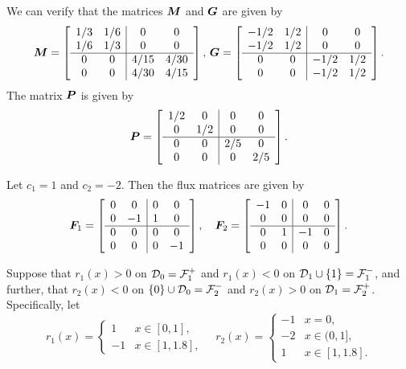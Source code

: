 We can verify that the matrices \(\boldsymbol M\) and \(\boldsymbol G\) are given by 
\[\boldsymbol M = \left[\begin{array}{cc|cc} 1/3 & 1/6 & 0 & 0 \\ 1/6 & 1/3 & 0 & 0 \\\hline 0 & 0 & 4/15 & 4/30 \\ 0 & 0 & 4/30 & 4/15 \end{array}\right],\, \boldsymbol G = \left[\begin{array}{cc|cc} -1/2 & 1/2 & 0 & 0 \\ -1/2 & 1/2 & 0 & 0 \\\hline 0 & 0 & -1/2 & 1/2 \\ 0 & 0 & -1/2 & 1/2 \end{array}\right].\] 
The matrix \(\boldsymbol P\) is given by 
\[\boldsymbol P = \left[\begin{array}{cc|cc} 1/2 & 0 & 0 & 0 \\ 0 & 1/2 & 0 & 0 \\\hline 0 & 0 & 2/5 & 0 \\ 0 & 0 & 0 & 2/5 \end{array}\right].\]

Let \(c_1=1\) and \(c_2=-2\). Then the flux matrices are given by 
\[\boldsymbol F_1 = \left[\begin{array}{cc|cc} 0 & 0 & 0 & 0 \\ 0 & -1 & 1 & 0 \\\hline 0 & 0 & 0 & 0 \\ 0 & 0 & 0 & -1 \end{array}\right],\quad \boldsymbol F_2 = \left[\begin{array}{cc|cc} -1 & 0 & 0 & 0 \\ 0 & 0 & 0 & 0 \\\hline 0 & 1 & -1 & 0 \\ 0 & 0 & 0 & 0 \end{array}\right].\]

Suppose that \(r_1(x)>0\) on \(\mathcal{D}_0=\mathcal F_1^+\) and \(r_1(x)<0\) on \(\mathcal{D}_1\cup\{1\}=\mathcal F_1^-\), and further, that \(r_2(x)<0\) on \(\{0\}\cup\mathcal{D}_0=\mathcal F_2^-\) and \(r_2(x)>0\) on \(\mathcal{D}_1=\mathcal F_2^+\). Specifically, let 
\[r_1(x) = \begin{cases} 1 & x \in [0,1], \\ -1 & x \in [1,1.8],\end{cases}\quad r_2(x) = \begin{cases} -1 & x = 0, \\ -2 & x \in (0,1], \\ 1 & x \in [1,1.8]. \end{cases}\]


